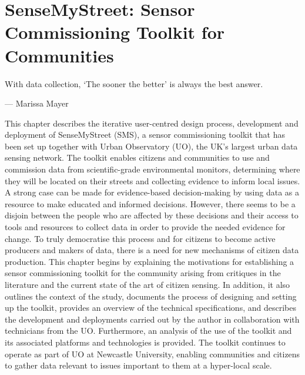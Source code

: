 \chapter[SenseMyStreet]{SenseMyStreet: Sensor Commissioning Toolkit for Communities}
\label{chap:sensemystreet}


\ifpdf
    \graphicspath{{Chapter2/Figs/Raster/}{Chapter2/Figs/PDF/}{Chapter2/Figs/}}
\else
    \graphicspath{{Chapter2/Figs/Vector/}{Chapter2/Figs/}}
\fi

\epigraph{With data collection, `The sooner the better' is always the best answer.}{--- \textup{Marissa Mayer}}

This chapter describes the iterative user-centred design process, development and deployment of SenseMyStreet (SMS), a sensor commissioning toolkit that has been set up together with Urban Observatory (UO), the UK's largest urban data sensing network. The toolkit enables citizens and communities to use and commission data from scientific-grade environmental monitors, determining where they will be located on their streets and collecting evidence to inform local issues. A strong case can be made for evidence-based decision-making by using data as a resource to make educated and informed decisions. However, there seems to be a disjoin between the people who are affected by these decisions and their access to tools and resources to collect data in order to provide the needed evidence for change. To truly democratise this process and for citizens to become active producers and makers of data, there is a need for new mechanisms of citizen data production. This chapter begins by explaining the motivations for establishing a sensor commissioning toolkit for the community arising from critiques in the literature and the current state of the art of citizen sensing. In addition, it also outlines the context of the study, documents the process of designing and setting up the toolkit, provides an overview of the technical specifications, and describes the development and deployments carried out by the author in collaboration with technicians from the UO. Furthermore, an analysis of the use of the toolkit and its associated platforms and technologies is provided. The toolkit continues to operate as part of UO at Newcastle University, enabling communities and citizens to gather data relevant to issues important to them at a hyper-local scale.
\clearpage

